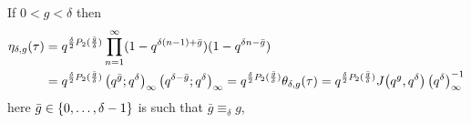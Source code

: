 \documentclass{article}
\begin{document}
\begin{Hemmecke}

\begin{AdditionalInformation}
If $0<g<\delta$ then
\begin{align}
  \eta_{\delta,g}(\tau)
  &=
  q^{\frac{\delta}{2}P_2(\frac{\bar{g}}{\delta})}
  \prod_{n=1}^\infty (1-q^{\delta (n-1)+\bar{g}})(1-q^{\delta n-\bar{g}})
  \notag\\
  &=
  q^{\frac{\delta}{2}P_2(\frac{\bar{g}}{\delta})}
  \left( q^{\bar{g}};q^\delta \right)_{\infty} \left( q^{\delta-\bar{g}};q^\delta \right)_{\infty}
  =
  q^{\frac{\delta}{2}P_2(\frac{\bar{g}}{\delta})}
  \theta_{\delta,g}(\tau)
  =
  q^{\frac{\delta}{2}P_2(\frac{\bar{g}}{\delta})}
  J\!\left(q^g,q^\delta\right) \left({q}^{\delta}\right)_{\infty}^{-1}
  \label{eq:eta_delta-g^[R](tau)}
\end{align}
here $\bar{g}\in\left\{0,\ldots,\delta-1\right\}$ is such that
$\bar{g} \equiv_\delta g$,
\end{AdditionalInformation}

\end{Hemmecke}
\end{document}
